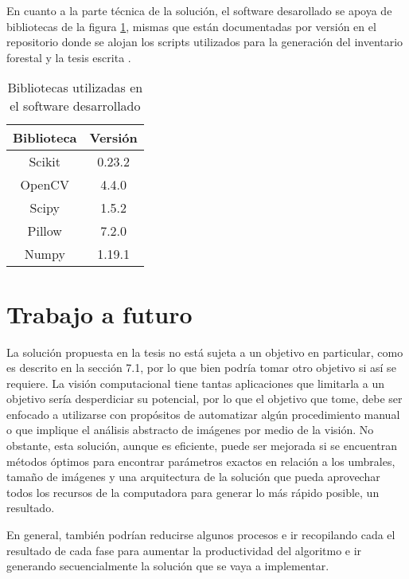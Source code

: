 En cuanto a la parte técnica de la solución, el software desarollado se apoya de bibliotecas de la figura \ref{Bibliotecas utilizadas en el software desarrollado}, mismas que están documentadas por versión en el repositorio donde se alojan los scripts utilizados para la generación del inventario forestal y la tesis escrita \citep{rf18}.

\begin{table}[H]
	{\centering
		\caption{Bibliotecas utilizadas en el software desarrollado}
		\begin{tabular}{|c|c|}
			\hline
			Biblioteca & Versión\\
			\hline
			Scikit & 0.23.2\\
			\hline
			OpenCV & 4.4.0\\
			\hline
			Scipy & 1.5.2\\
			\hline
			Pillow & 7.2.0\\
			\hline
			Numpy & 1.19.1\\
			\hline
		\end{tabular}

	\label{Bibliotecas utilizadas en el software desarrollado}}
\end{table}
\clearpage
\section{Trabajo a futuro}
La solución propuesta en la tesis no está sujeta a un objetivo en particular, como es descrito en la sección 7.1, por lo que bien podría tomar otro objetivo si así se requiere. La visión computacional tiene tantas aplicaciones que limitarla a un objetivo sería desperdiciar su potencial, por lo que el objetivo que tome, debe ser enfocado a utilizarse con propósitos de automatizar algún procedimiento manual o que implique el análisis abstracto de imágenes por medio de la visión. No obstante, esta solución, aunque es eficiente, puede ser mejorada si se encuentran métodos óptimos para encontrar parámetros exactos en relación a los umbrales, tamaño de imágenes y una arquitectura de la solución que pueda aprovechar todos los recursos de la computadora para generar lo más rápido posible, un resultado.

En general, también podrían reducirse algunos procesos e ir recopilando cada el resultado de cada fase para aumentar la productividad del algoritmo e ir generando secuencialmente la solución que se vaya a implementar.

